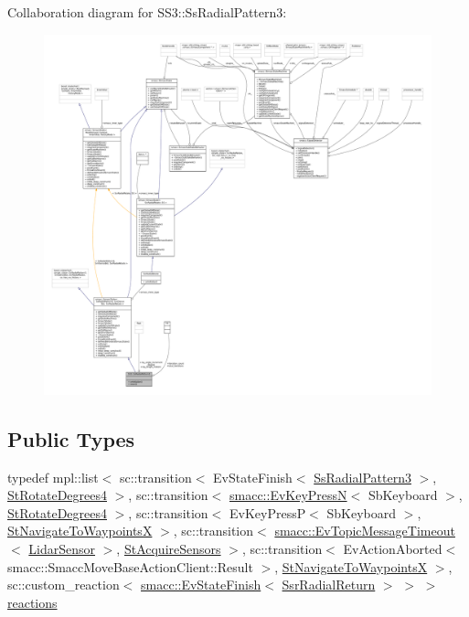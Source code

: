 Collaboration diagram for S\+S3\+:\+:Ss\+Radial\+Pattern3\+:
\nopagebreak
\begin{figure}[H]
\begin{center}
\leavevmode
\includegraphics[width=350pt]{structSS3_1_1SsRadialPattern3__coll__graph}
\end{center}
\end{figure}
\subsection*{Public Types}
\begin{DoxyCompactItemize}
\item 
typedef mpl\+::list$<$ sc\+::transition$<$ Ev\+State\+Finish$<$ \hyperlink{structSS3_1_1SsRadialPattern3}{Ss\+Radial\+Pattern3} $>$, \hyperlink{structStRotateDegrees4}{St\+Rotate\+Degrees4} $>$, sc\+::transition$<$ \hyperlink{structsmacc_1_1EvKeyPressN}{smacc\+::\+Ev\+Key\+PressN}$<$ Sb\+Keyboard $>$, \hyperlink{structStRotateDegrees4}{St\+Rotate\+Degrees4} $>$, sc\+::transition$<$ Ev\+Key\+PressP$<$ Sb\+Keyboard $>$, \hyperlink{structStNavigateToWaypointsX}{St\+Navigate\+To\+WaypointsX} $>$, sc\+::transition$<$ \hyperlink{structsmacc_1_1EvTopicMessageTimeout}{smacc\+::\+Ev\+Topic\+Message\+Timeout}$<$ \hyperlink{sensor__state_8h_a9db9e1944f88de79507758d08e4a2ee3}{Lidar\+Sensor} $>$, \hyperlink{structStAcquireSensors}{St\+Acquire\+Sensors} $>$, sc\+::transition$<$ Ev\+Action\+Aborted$<$ smacc\+::\+Smacc\+Move\+Base\+Action\+Client\+::\+Result $>$, \hyperlink{structStNavigateToWaypointsX}{St\+Navigate\+To\+WaypointsX} $>$, sc\+::custom\+\_\+reaction$<$ \hyperlink{structsmacc_1_1EvStateFinish}{smacc\+::\+Ev\+State\+Finish}$<$ \hyperlink{structSsrRadialReturn}{Ssr\+Radial\+Return} $>$ $>$ $>$ \hyperlink{structSS3_1_1SsRadialPattern3_a116974064de40ec9581c679ac0762f11}{reactions}
\end{DoxyCompactItemize}

